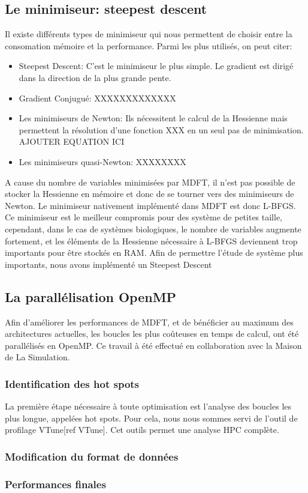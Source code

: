 \subsection{Le minimiseur: steepest descent}
Il existe différents types de minimiseur qui nous permettent de choisir entre la consomation mémoire et la performance. Parmi les plus utilisés, on peut citer:
\begin{itemize}
  \item Steepest Descent: C'est le minimiseur le plus simple. Le gradient est dirigé dans la direction de la plus grande pente.
  \item Gradient Conjugué: XXXXXXXXXXXXX
  \item Les minimiseurs de Newton: Ils nécessitent le calcul de la Hessienne mais permettent la résolution d'une fonction XXX en un seul pas de minimisation. AJOUTER EQUATION ICI
  \item Les minimiseurs quasi-Newton: XXXXXXXX
  \vspace*{1.5ex}%
\end{itemize}



A cause du nombre de variables minimisées par MDFT, il n'est pas possible de stocker la Hessienne en mémoire et donc de se tourner vers des minimiseurs de Newton. Le minimiseur nativement implémenté dans MDFT est donc L-BFGS. Ce minimiseur est le meilleur compromis pour des système de petites taille, cependant, dans le cas de systèmes biologiques, le nombre de variables augmente fortement, et les éléments de la Hessienne nécessaire à L-BFGS deviennent trop importants pour être stockés en RAM. Afin de permettre l'étude de système plus importants, nous avons implémenté un Steepest Descent






\subsection{La parallélisation OpenMP}
Afin d'améliorer les performances de MDFT, et de bénéficier au maximum des architectures actuelles, les boucles les plus coûteuses en temps de calcul, ont été parallélisés en OpenMP. Ce travail à été effectué en collaboration avec la Maison de La Simulation.

\subsubsection{Identification des hot spots}
La première étape nécessaire à toute optimisation est l'analyse des boucles les plus longue, appelées hot spots. Pour cela, nous nous sommes servi de l’outil de profilage VTune[ref VTune]. Cet outils permet une analyse HPC complète.

\subsubsection{Modification du format de données}


\subsubsection{Performances finales}





